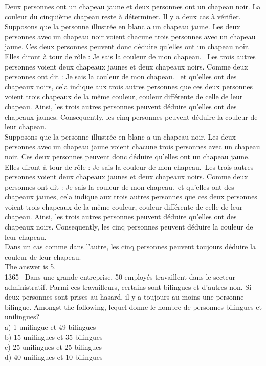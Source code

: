 \documentclass[letterpaper, 12pt]{article}
\begin{document}
Deux personnes ont un chapeau jaune et deux personnes ont un chapeau noir.
La couleur du cinqui\`eme
chapeau reste \`a d\'eterminer.  Il y a deux cas \`a v\'erifier.\\
Supposons que la personne illustr\'ee en blanc a un chapeau jaune.
Les deux personnes avec un chapeau noir voient chacune trois
personnes avec un chapeau jaune.  Ces deux personnes peuvent donc
d\'eduire qu'elles ont un chapeau noir.  Elles diront \`a tour de
r\^ole : \og Je sais la couleur de mon chapeau. \fg\ Les trois
autres personnes voient deux chapeaux jaunes et deux chapeaux noirs.
Comme deux personnes ont dit : \og Je sais la couleur de mon
chapeau. \fg\ et qu'elles ont des chapeaux noirs, cela indique aux
trois autres personnes que ces deux personnes voient trois chapeaux
de la m\^eme couleur, couleur diff\'erente de celle de leur chapeau.
Ainsi, les trois autres personnes peuvent d\'eduire qu'elles ont des
chapeaux jaunes. Consequently, les cinq personnes peuvent
d\'eduire la couleur de leur
chapeau.\\

Supposons que la personne illustr\'ee en blanc a un chapeau noir.
Les deux personnes avec un chapeau jaune voient chacune trois
personnes avec un chapeau noir.  Ces deux personnes peuvent donc
d\'eduire qu'elles ont un chapeau jaune.  Elles diront \`a tour de
r\^ole : \og Je sais la couleur de mon chapeau.\fg\ Les trois autres
personnes voient deux chapeaux jaunes et deux chapeaux noirs.  Comme
deux personnes ont dit : \og Je sais la couleur de mon chapeau.\fg\
et qu'elles ont des chapeaux jaunes, cela indique aux trois autres
personnes que ces deux personnes voient trois chapeaux de la m\^eme
couleur, couleur diff\'erente de celle de leur chapeau. Ainsi, les
trois autres personnes peuvent d\'eduire qu'elles ont des chapeaux
noirs.  Consequently, les cinq personnes peuvent d\'eduire la
couleur de
leur chapeau.\\

Dans un cas comme dans l'autre, les cinq personnes peuvent toujours
d\'eduire la couleur de leur chapeau.\\

The answer is 5.\\

1365-- Dans une grande entreprise, 50 employ\'es travaillent dans le secteur
administratif.  Parmi ces travailleurs, certains sont bilingues et d'autres
non.  Si deux personnes sont prises au hasard, il y a toujours au moins une
personne bilingue.  Amongst the following, lequel donne le
nombre de personnes bilingues et unilingues?\\
a) 1 unilingue et 49 bilingues\\
b) 15 unilingues et 35 bilingues\\
c) 25 unilingues et 25 bilingues\\
d) 40 unilingues et 10 bilingues\\
\end{document}
